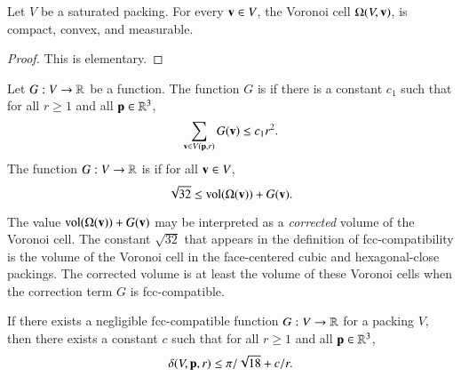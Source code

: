 \begin{lemma}
Let $ V$ be a saturated packing.  For every ${\mathbf v}\in  V$, 
the Voronoi cell $\Omega( V,{\mathbf v})$,  is
compact, convex, and measurable.
\end{lemma}

\begin{proof}  This is elementary.
\end{proof}

\begin{definition}\label{def:negligible}
Let $G: V\to{\mathbb R}$ be a function.  The function $G$
is 
if there is a constant $c_1$ such that for all $r\ge1$ and all
${\mathbf p}\in\mathbb{R}^3$,
   \begin{displaymath}\sum_{{\mathbf v}\in V({\mathbf p},r)} G({\mathbf v}) \le c_1 r^2.\end{displaymath}
The function $G: V\to{\mathbb R}$ is
if for all ${\mathbf v}\in V$, 
\begin{displaymath}\sqrt{32}\le {\operatorname{vol}}(\Omega({\mathbf v})) + G({\mathbf v}).\end{displaymath}
%
%
%
\end{definition}





\begin{remark}
The value ${\operatorname{vol}}(\Omega({\mathbf v})) + G({\mathbf v})$ may be interpreted as a
{\it corrected\/} volume of the Voronoi
cell. The constant $\sqrt{32}$ that appears in the definition of fcc-compatibility is the volume of the Voronoi cell in the face-centered cubic and hexagonal-close packings.  The corrected volume is at least the volume of these
Voronoi cells when the correction term $G$ is fcc-compatible.
%
\end{remark}



\begin{lemma}
\label{lemma:deltabound} If there exists a %
negligible  fcc-compatible function%
$G: V\to{\mathbb R}$ for a 
packing $ V$, then there
exists a constant $c$ such that for all $r\ge1$ and all
${\mathbf p}\in\mathbb{R}^3$,
    \begin{displaymath}
    \delta( V,{\mathbf p},r)
    \le \pi/\sqrt{18} + c/r.
    \end{displaymath}
\end{lemma}

